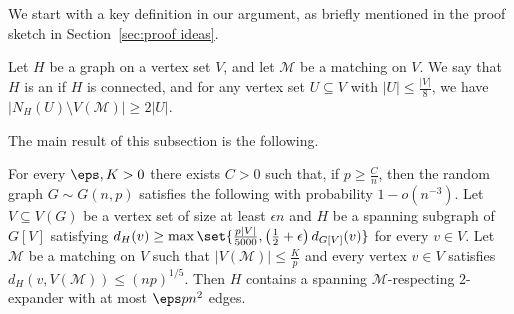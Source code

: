 \documentclass[10pt,a4paper,reqno]{amsart}
\begin{document}
We start with a key definition in our argument, as briefly mentioned in the proof sketch in Section~\ref{sec:proof ideas}.
\begin{definition}
Let $H$ be a graph on a vertex set $V$, and let $\mathcal{M}$ be a matching on $V$. We say that $H$ is an  if $H$ is connected, and for any vertex set $U \subseteq V$ with $|U| \leq \frac{|V|}{8}$, we have $|N_H(U) \setminus V(\mathcal{M})| \geq 2|U|$.
\end{definition}
The main result of this subsection is the following.
\begin{theorem} \label{thm:expander}
  For every $\eps, K >0$ there exists $C > 0$ such that, if $p \ge \frac{C}{n}$, then the random graph $G \sim G(n,p)$ satisfies the following with probability $1-o(n^{-3})$. Let $V \subseteq V(G)$ be a vertex set of size at least $\epsilon n$ and $H$ be a spanning subgraph of $G[V]$ satisfying $d_H(v)\ge \max\set{\frac{p|V|}{5000}, \left(\frac{1}{2} + \epsilon\right)d_{G[V]}(v)}$ for every $v\in V$. Let $\mathcal{M}$ be a matching on $V$ such that $|V(\mathcal{M})|\le \frac{K}{p}$ and every vertex $v\in V$ satisfies $d_H(v,V(\mathcal{M}))\le (np)^{1/5}$. Then $H$ contains a spanning $\mathcal{M}$-respecting $2$-expander with at most $\eps p n^2$ edges.
\end{theorem}
\end{document}
